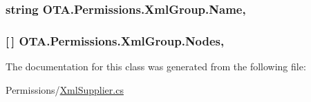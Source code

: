 \subsubsection[{Name}]{\setlength{\rightskip}{0pt plus 5cm}string O\+T\+A.\+Permissions.\+Xml\+Group.\+Name\hspace{0.3cm}{\ttfamily [get]}, {\ttfamily [set]}}\label{class_o_t_a_1_1_permissions_1_1_xml_group_a052d5af412a022846cca6391be50aa74}
\hypertarget{class_o_t_a_1_1_permissions_1_1_xml_group_ad9a679412d2984d468e6ef9178e9e43d}{}
\subsubsection[{Nodes}]{ \mbox{[}$\,$\mbox{]} O\+T\+A.\+Permissions.\+Xml\+Group.\+Nodes\hspace{0.3cm}{\ttfamily [get]}, {\ttfamily [set]}}\label{class_o_t_a_1_1_permissions_1_1_xml_group_ad9a679412d2984d468e6ef9178e9e43d}


The documentation for this class was generated from the following file\+:\begin{DoxyCompactItemize}
\item 
Permissions/\hyperlink{_xml_supplier_8cs}{Xml\+Supplier.\+cs}\end{DoxyCompactItemize}
